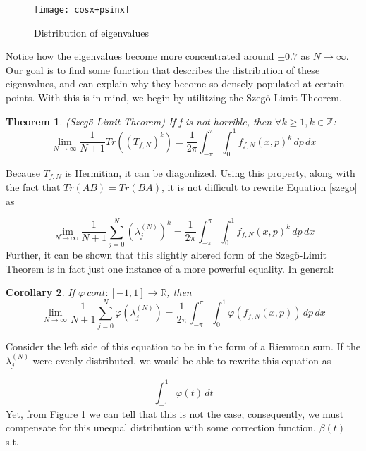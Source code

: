 \documentclass{article}
\newtheorem{theorem}{Theorem}[section]
\newtheorem{corollary}[theorem]{Corollary}
\begin{document}
\begin{figure} [H]
\centerline{\texttt{[image: cosx+psinx]}}
\caption{Distribution of eigenvalues}
\end{figure}

Notice how the eigenvalues become more concentrated around $\pm0.7$ as $N \rightarrow \infty$.  Our goal is to find some function that describes the distribution of these eigenvalues, and can explain why they become so densely populated at certain points. With this is in mind, we begin by utilitzing the Szeg\"{o}-Limit Theorem. 

\begin{theorem} \emph{(Szeg\"{o}-Limit Theorem)} \label{Szego} If f is not horrible, then $\forall k \ge 1, k \in \mathbb{Z}$: \begin{equation}
\lim_{N \to \infty} \frac{1}{N+1} Tr((T_{f,N})^k) = \frac{1}{2\pi} \int^{\pi}_{-\pi} \! \int^1_0  f_{f,N}(x,p)^k \,dp \,dx \label{szego}
\end{equation} 
\end{theorem}

 Because $T_{f,N}$ is Hermitian, it can be diagonlized.  Using this property, along with the fact that $Tr(AB) = Tr(BA)$, it is not difficult to rewrite Equation \ref{szego} as 

\begin{equation} 
\lim_{N \to \infty} \frac{1}{N+1} \displaystyle\sum\limits_{j=0}^{N} (\lambda_{j}^{(N)})^k= \frac{1}{2\pi} \int^{\pi}_{-\pi} \! \int^1_0  f_{f,N}(x,p)^k \,dp \,dx 
\end{equation} Further, it can be shown that this slightly altered form of the Szeg\"{o}-Limit Theorem is in fact just one instance of a more powerful equality.  In general:

\begin{corollary}
If $\varphi \ cont:[-1,1] \rightarrow \mathbb{R}$, then
\begin{equation}
\lim_{N \to \infty} \frac{1}{N+1}  \displaystyle\sum\limits_{j=0}^N \varphi(\lambda_{j}^{(N)})= \frac{1}{2\pi} \int^{\pi}_{-\pi} \! \int^1_0  \varphi(f_{f,N}(x,p)) \,dp \,dx \label{BIGGUY}
\end{equation}
\end{corollary}

Consider the left side of this equation to be in the form of a Riemman sum. If the $\lambda_{j}^{(N)}$ were evenly distributed, we would be able to rewrite this equation as 

\begin{equation} 
\int^1_{-1} \varphi(t) \,dt 
\end{equation} Yet, from Figure 1 we can tell that this is not the case; consequently, we must compensate for this unequal distribution with some correction function, $\beta(t)$ s.t. 
\end{document}
